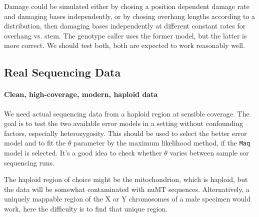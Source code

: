 \documentclass{article}
\begin{document}
Damage could be simulated either by chosing a position dependent damage
rate and damaging bases independently, or by chosing overhang lengths
according to a distribution, then damaging bases independently at
different constant rates for overhang vs. stem.  The genotype caller
uses the former model, but the latter is more correct.  We should test
both, both are expected to work reasonably well.





\subsection{Real Sequencing Data}

\paragraph{Clean, high-coverage, modern, haploid data}

We need actual sequencing data from a haploid region at sensible
coverage.  The goal is to test the two available error models in a
setting without confounding factors, especially heterozygosity.  This
should be used to select the better error model and to fit the $\theta$
parameter by the maximum likelihood method, if the \texttt{Maq} model is
selected.  It's a good idea to check whether $\theta$ varies between
sample sor sequencing runs.

The haploid region of choice might be the mitochondrion, which is
haploid, but the data will be somewhat contaminated with nuMT sequences.
Alternatively, a uniquely mappable region of the X or Y chromosomes of a
male specimen would work, here the difficulty is to find that unique
region.
\end{document}
